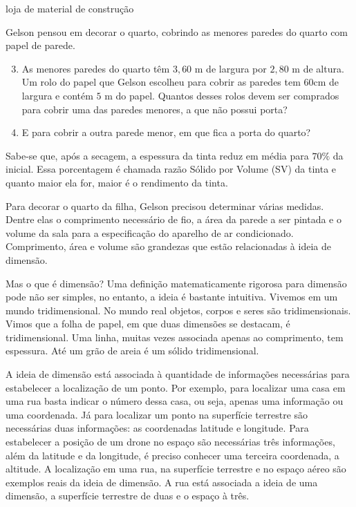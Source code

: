 \begin{task}{loja de material de construção}
\begin{enumerate}
\end{enumerate}

Gelson pensou em decorar o quarto, cobrindo as menores paredes do quarto com papel de parede.
\begin{enumerate}
\setcounter{enumi}{2}
\item {} 
As menores paredes do quarto têm $3{,}60$ m de largura por $2{,}80$ m de altura. Um rolo do papel  que Gelson escolheu para cobrir as paredes tem 60cm de largura e contém $5$ m do papel. Quantos desses rolos devem ser comprados para cobrir uma das paredes menores, a que não possui porta?

\item {} 
E para cobrir a outra parede menor, em que  fica a porta do quarto?

\end{enumerate}
\end{task}

\begin{observation}

Sabe-se que, após a secagem, a espessura da tinta reduz em média para $70\%$ da inicial. Essa porcentagem é chamada razão Sólido por Volume (SV) da tinta e quanto maior ela for, maior é o rendimento da tinta.
\end{observation}


\label{\detokenize{GE504-3:organizando-as-ideias-dimensao}}\label{\detokenize{GE504-3::doc}}
Para decorar o quarto da filha, Gelson precisou determinar várias medidas. Dentre elas o comprimento necessário de fio, a área da parede a ser pintada e o volume da sala para a especificação do aparelho de ar condicionado. Comprimento, área e volume são grandezas que estão relacionadas à ideia de dimensão.

Mas o que é dimensão? Uma definição matematicamente rigorosa para dimensão pode não ser simples, no entanto, a ideia é bastante intuitiva. Vivemos em um mundo tridimensional. No mundo real objetos, corpos e seres são tridimensionais. Vimos que a folha de papel, em que duas dimensões se destacam, é tridimensional. Uma linha, muitas vezes associada apenas ao comprimento, tem espessura. Até um grão de areia é um sólido tridimensional.

A ideia de dimensão está associada à quantidade de informações necessárias para estabelecer a localização de um ponto. Por exemplo, para localizar uma casa em uma rua basta indicar o número dessa casa, ou seja, apenas uma informação ou uma coordenada. Já para localizar um ponto na superfície terrestre são necessárias duas informações: as coordenadas latitude e longitude. Para estabelecer a posição de um drone no espaço são necessárias três informações, além da latitude e da longitude, é preciso conhecer uma terceira coordenada, a altitude. A localização em uma rua, na superfície terrestre e no espaço aéreo são exemplos reais da ideia de dimensão. A rua está associada a ideia de uma dimensão, a superfície terrestre de duas e o espaço à três.

